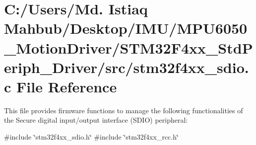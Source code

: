 \section{C\+:/\+Users/\+Md. Istiaq Mahbub/\+Desktop/\+I\+M\+U/\+M\+P\+U6050\+\_\+\+Motion\+Driver/\+S\+T\+M32\+F4xx\+\_\+\+Std\+Periph\+\_\+\+Driver/src/stm32f4xx\+\_\+sdio.c File Reference}
\label{stm32f4xx__sdio_8c}


This file provides firmware functions to manage the following functionalities of the Secure digital input/output interface (S\+D\+IO) peripheral\+:  


{\ttfamily \#include \char`\"{}stm32f4xx\+\_\+sdio.\+h\char`\"{}}\newline
{\ttfamily \#include \char`\"{}stm32f4xx\+\_\+rcc.\+h\char`\"{}}\newline
